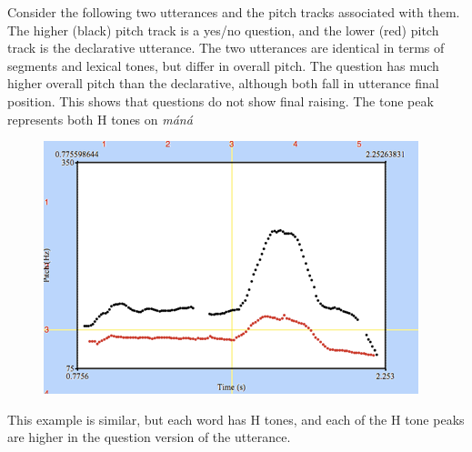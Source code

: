 Consider the following two utterances and the pitch tracks associated with them. The higher (black) pitch track is a yes/no question, and the lower (red) pitch track is the declarative utterance. The two utterances are identical in terms of segments and lexical tones, but differ in overall pitch. The question has much higher overall pitch than the declarative, although both fall in utterance final position. This shows that questions do not show final raising. The tone peak represents both H tones on \textit{máná}

\begin{figure}
  \includegraphics[width=\linewidth]{figures/fig-ch4-4.png}
\caption{}
  \label{fig:4-4}
\end{figure}

This example is similar, but each word has H tones, and each of the H tone peaks are higher in the question version of the utterance.

